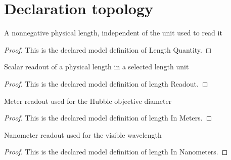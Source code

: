 \section{Declaration topology}
\begin{definition}
  \label{def:physics:phyx-mini-0131:phyxminiproblems-problemphyxmini0131-lengthquantity}
  A nonnegative physical length, independent of the unit used to read it
\end{definition}
\begin{proof}
  This is the declared model definition of Length Quantity.
\end{proof}
\begin{definition}
  \label{def:physics:phyx-mini-0131:phyxminiproblems-problemphyxmini0131-lengthreadout}
  Scalar readout of a physical length in a selected length unit
\end{definition}
\begin{proof}
  This is the declared model definition of length Readout.
\end{proof}
\begin{definition}
  \label{def:physics:phyx-mini-0131:phyxminiproblems-problemphyxmini0131-lengthinmeters}
  Meter readout used for the Hubble objective diameter
\end{definition}
\begin{proof}
  This is the declared model definition of length In Meters.
\end{proof}
\begin{definition}
  \label{def:physics:phyx-mini-0131:phyxminiproblems-problemphyxmini0131-lengthinnanometers}
  Nanometer readout used for the visible wavelength
\end{definition}
\begin{proof}
  This is the declared model definition of length In Nanometers.
\end{proof}
